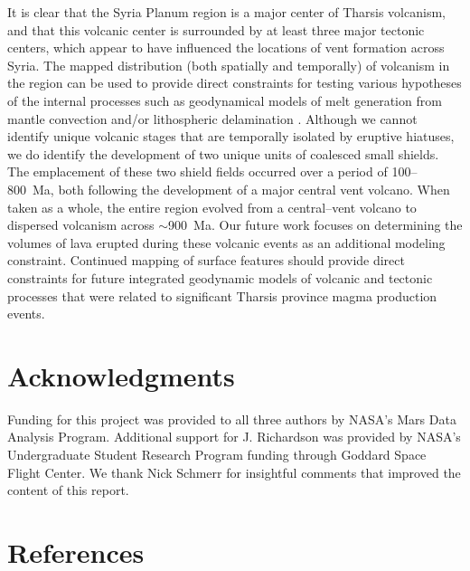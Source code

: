 It is clear that the Syria Planum region is a major center of Tharsis volcanism, and that this volcanic center is surrounded by at least three major tectonic centers, which appear to have influenced the locations of vent formation across Syria. The mapped distribution (both spatially and temporally) of volcanism in the region can be used to provide direct constraints for testing various hypotheses of the internal processes such as geodynamical models of melt generation from mantle convection \citep[e.g.]{ONeill2007} and/or lithospheric delamination \citep[e.g.]{Scott2003}. Although we cannot identify unique volcanic stages that are temporally isolated by eruptive hiatuses, we do identify the development of two unique units of coalesced small shields. The emplacement of these two shield fields occurred over a period of 100--800~Ma, both following the development of a major central vent volcano. When taken as a whole, the entire region evolved from a central--vent volcano to dispersed volcanism across $\sim$900~Ma. Our future work focuses on determining the volumes of lava erupted during these volcanic events as an additional modeling constraint. Continued mapping of surface features should provide direct constraints for future integrated geodynamic models of volcanic and tectonic processes that were related to significant Tharsis province magma production events.

\section{Acknowledgments}

Funding for this project was provided to all three authors by NASA's Mars Data Analysis Program. Additional support for J. Richardson was provided by NASA's Undergraduate Student Research Program funding through Goddard Space Flight Center. We thank Nick Schmerr for insightful comments that improved the content of this report.


\section{References}

